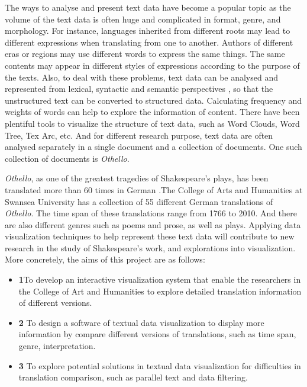 The ways to analyse and present text data have become a popular topic as the volume of the text data is often huge and complicated in format, genre, and morphology. For instance, languages inherited from different roots may lead to different expressions when translating from one to another. Authors of different eras or regions may use different words to express the same things. The same contents may appear in different styles of expressions according to the purpose of the texts. Also, to deal with these problems, text data can be analysed and represented from lexical, syntactic and semantic perspectives \cite{Ward2015}, so that the unstructured text can be converted to structured data. Calculating frequency and weights of words can help to explore the information of content. There have been plentiful tools to visualize the structure of text data, such as Word Clouds, Word Tree, Tex Arc, etc. And for different research purpose, text data are often analysed separately in a single document and a collection of documents. One such collection of documents is \emph{Othello}.

\emph{Othello}, as one of the greatest tragedies of Shakespeare's plays, has been translated more than 60 times in German  \cite{Geng2011}.The College of Arts and Humanities at Swansea University has a collection of 55 different German translations of \emph{Othello}. The time span of these translations range from 1766 to 2010. And there are also different genres such as poems and prose, as well as plays. Applying data visualization techniques to help represent these text data will contribute to new research in the study of Shakespeare's work, and explorations into visualization. More concretely, the aims of this project are as follows:

\begin{itemize}
	\item \textbf{1}To develop an interactive visualization system that enable the researchers in the College of Art and Humanities to explore detailed translation information of different versions.
	\item \textbf{2} To design a software of textual data visualization to display more information by compare different versions of translations, such as time span, genre, interpretation.
	\item \textbf{3} To explore potential solutions in textual data visualization for difficulties in translation comparison, such as parallel text and data filtering.
\end{itemize}

